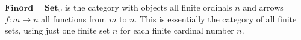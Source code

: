$\mathbf{Finord} = \mathbf{Set}_\omega$ is the category with objects all finite ordinals $n$ and arrows $f : m \to n$ all functions from $m$ to $n$. This is essentially the category of all finite sets, using just one finite set $n$ for each finite cardinal number $n$.
